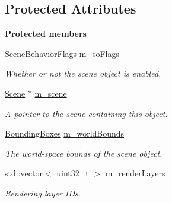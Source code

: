 \subsection*{Protected Attributes}
\begin{Indent}\textbf{ Protected members}\par
\begin{DoxyCompactItemize}
\item 
\mbox{\label{classrev_1_1_scene_object_acd2eb26c7ee3e991638b34126145f22b}} 
Scene\+Behavior\+Flags \mbox{\hyperlink{classrev_1_1_scene_object_acd2eb26c7ee3e991638b34126145f22b}{m\+\_\+so\+Flags}}
\begin{DoxyCompactList}\small\item\em Whether or not the scene object is enabled. \end{DoxyCompactList}\item 
\mbox{\label{classrev_1_1_scene_object_a0a6b408d770929816a2424bf20e055ed}} 
\mbox{\hyperlink{classrev_1_1_scene}{Scene}} $\ast$ \mbox{\hyperlink{classrev_1_1_scene_object_a0a6b408d770929816a2424bf20e055ed}{m\+\_\+scene}}
\begin{DoxyCompactList}\small\item\em A pointer to the scene containing this object. \end{DoxyCompactList}\item 
\mbox{\label{classrev_1_1_scene_object_a2a9e72d809e88e7e235245fffba36236}} 
\mbox{\hyperlink{classrev_1_1_bounding_geometry}{Bounding\+Boxes}} \mbox{\hyperlink{classrev_1_1_scene_object_a2a9e72d809e88e7e235245fffba36236}{m\+\_\+world\+Bounds}}
\begin{DoxyCompactList}\small\item\em The world-\/space bounds of the scene object. \end{DoxyCompactList}\item 
std\+::vector$<$ uint32\+\_\+t $>$ \mbox{\hyperlink{classrev_1_1_scene_object_a70ef7a7bc84a8565aa2fb6d30253019e}{m\+\_\+render\+Layers}}
\begin{DoxyCompactList}\small\item\em Rendering layer I\+Ds. \end{DoxyCompactList}\item 
\mbox{\label{classrev_1_1_scene_object_adae45070e8f54a3e74a2d0de1bf1dd9d}} 

\end{DoxyCompactItemize}
\end{Indent}
